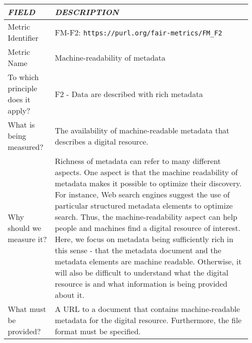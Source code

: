 \documentclass[english]{article}
\begin{document}



\newpage


\centering

\begin{longtable}{|p{5cm}|p{9cm}|}
\hline
\emph{FIELD} & \emph{DESCRIPTION} \\
\hline
Metric Identifier &   FM-F2: \verb"https://purl.org/fair-metrics/FM_F2"
 \\


\hline
Metric Name &   
Machine-readability of metadata

 \\



\hline
To which principle does it apply? &   F2 - Data are described with rich metadata\\



\hline
What is being measured? & 

The availability of machine-readable metadata that describes a digital resource.\\



\hline
Why should we measure it? & 


Richness of metadata can refer to many different aspects. One aspect is that the machine readability of metadata makes it possible to optimize their discovery. For instance, Web search engines suggest the use of particular structured metadata elements to optimize search. Thus, the machine-readability aspect can help people and machines find a digital resource of interest. Here, we focus on metadata being sufficiently rich in this sense - that the metadata document and the metadata elements are machine readable.  Otherwise, it will also be difficult to understand what the digital resource is and what information is being provided about it.

  
\\



\hline
What must be provided? &  

A URL to a document that contains machine-readable metadata for the digital resource. Furthermore, the file format must be specified.

 \\




\end{longtable}
\end{document}
